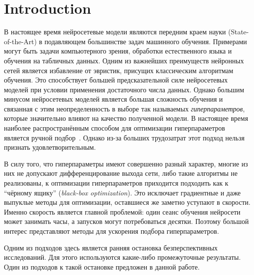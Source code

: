 \section{Introduction}
В настоящее время нейросетевые модели являются передним краем науки (State-of-the-Art) в подавляющем большинстве задач машинного обучения.
Примерами могут быть задачи компьютерного зрения, обработки естественного языка и обучения на табличных данных.
Одним из важнейших преимуществ нейронных сетей является избавление от эвристик, присущих классическим алгоритмам обучения.
Это способствует большей предсказательной силе нейросетевых моделей при условии применения достаточного числа данных.
Однако большим минусом нейросетевых моделей является большая сложность обучения и связанная с этим неопределенность в выборе так называемых \textit{гиперпараметров}, которые значительно влияют на качество полученной модели.
В настоящее время наиболее распространённым способом для оптимизации гиперпараметров является ручной подбор~\cite{bouthillier2020survey}.
Однако из-за больших трудозатрат этот подход нельзя признать удовлетворительным.

В силу того, что гиперпараметры имеют совершенно разный характер, многие из них не допускают дифференцирование выхода сети, либо такие алгоритмы не реализованы, к оптимизации гиперпараметров приходится подходить как к ``чёрному ящику'' (\textit{black-box optimization}).
Это исключает градиентные и даже выпуклые методы для оптимизации, оставшиеся же заметно уступают в скорости.
Именно скорость является главной проблемой: один сеанс обучения нейросети может занимать часы, а запусков могут потребоваться десятки.
Поэтому большой интерес представляют методы для ускорения подбора гиперпараметров.

Одним из подходов здесь является ранняя остановка безперспективных исследований.
Для этого используются какие-либо промежуточные результаты.
Один из подходов к такой остановке предложен в данной работе.